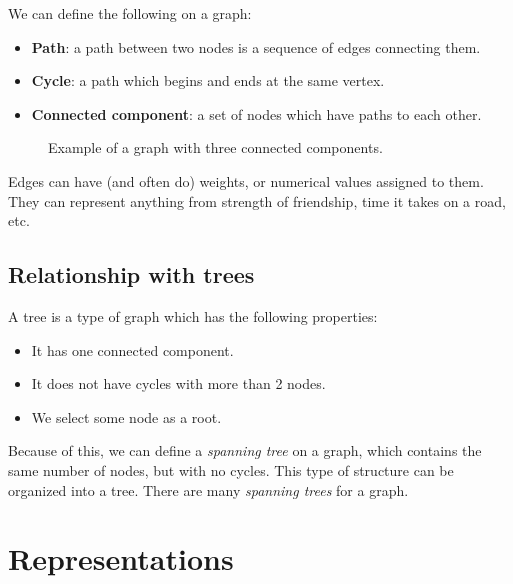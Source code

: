 \documentclass{article}
\begin{document}
We can define the following on a graph:
\begin{itemize}
\item \textbf{Path}: a path between two nodes is a sequence of edges connecting them.
\item \textbf{Cycle}: a path which begins and ends at the same vertex.
\item \textbf{Connected component}: a set of nodes which have paths to each other.
\end{itemize}

\begin{figure}
\centering
{}
\caption{Example of a graph with three connected components. \label{graph-example}}
\end{figure}

Edges can have (and often do) weights, or numerical values assigned to  them.  They can represent anything from strength of friendship, time it takes on a road, etc.

\subsection{Relationship with trees}
A tree is a type of graph which has the following properties:
\begin{itemize}
\item It has one connected component.
\item It does not have cycles with more than 2 nodes.
\item We select some node as a root.
\end{itemize}

Because of this, we can define a \textit{spanning tree} on a graph, which contains the same number of nodes, but with no cycles.  This type of structure can be organized into a tree.  There are many \textit{spanning trees} for a graph.

\section{Representations}
\end{document}
